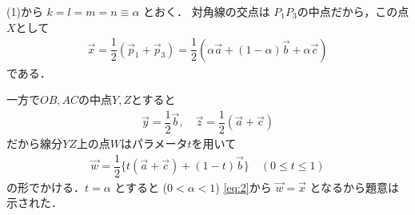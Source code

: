\documentclass[../../main.tex]{subfiles}
\begin{document}
(1)から $k = l = m = n \equiv \alpha$ とおく．
対角線の交点は $P_1P_3$の中点だから，この点$X$として
\begin{align}
  \vec{x}
  = \dfrac{1}{2}(\vec{p}_1+\vec{p}_3)
  = \dfrac{1}{2} \left( \alpha\vec{a} + (1-\alpha)\vec{b} + \alpha\vec{c} \right) \label{eq:2}
\end{align}
である．

一方で$OB, AC$の中点$Y, Z$とすると
\begin{align}
  \vec{y} = \dfrac{1}{2}\vec{b}, \quad
  \vec{z} = \dfrac{1}{2}(\vec{a}+\vec{c})
\end{align}
だから線分$YZ$上の点$W$はパラメータ$t$を用いて
\begin{align}
  \vec{w} = \dfrac{1}{2} \{t(\vec{a}+\vec{c}) + (1-t)\vec{b}\} \quad (0 \le t \le 1) \label{eq:3}
\end{align}
の形でかける．$t = \alpha$ とすると ($0 < \alpha < 1$) \cref{eq:2}から $\vec{w} = \vec{x}$ となるから題意は示された．
\end{document}
